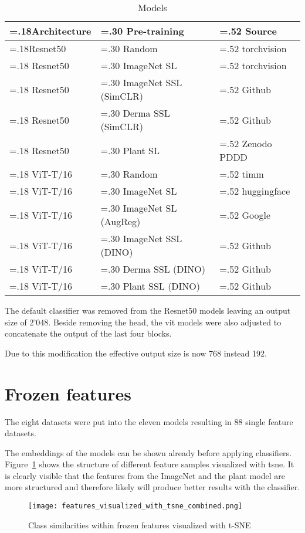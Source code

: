\begin{table}[H]
\centering
\caption{Models \label{tab:models}}
\begin{tabularx}{\textwidth}{|
    >{\hsize=.18\hsize}X |
    >{\hsize=.30\hsize}X |
    >{\hsize=.52\hsize}X |
}
\hline
\textbf{Architecture} & \textbf{Pre-training} & \textbf{Source} \tabularnewline \hline
Resnet50 & Random & torchvision \tabularnewline \hline
Resnet50 & ImageNet SL & torchvision \tabularnewline \hline
Resnet50 & ImageNet SSL (SimCLR) & Github \autocite{groeger2022} \tabularnewline \hline
Resnet50 & Derma SSL (SimCLR) & Github \autocite{groeger2022} \tabularnewline \hline
Resnet50 & Plant SL & Zenodo PDDD \autocite{zenodo2023} \tabularnewline \hline
ViT-T/16 & Random & timm \tabularnewline \hline
ViT-T/16 & ImageNet SL & huggingface \autocite{winkawaks2022} \tabularnewline \hline
ViT-T/16 & ImageNet SL (AugReg) & Google \autocite{google2024} \tabularnewline \hline
ViT-T/16 & ImageNet SSL (DINO) & Github \autocite{groeger2022} \tabularnewline \hline
ViT-T/16 & Derma SSL (DINO) & Github \autocite{groeger2022} \tabularnewline \hline
ViT-T/16 & Plant SSL (DINO) & Github \autocite{groeger2022} \tabularnewline \hline
\end{tabularx} 
\end{table}

The default classifier was removed from the Resnet50 models leaving an output size of 2'048.
Beside removing the head, the \gls{vit} models were also adjusted to concatenate the output of the last four blocks. 

Due to this modification the effective output size is now 768 instead 192.

\section{Frozen features}
The eight datasets were put into the eleven models resulting in 88 single feature datasets.

The embeddings of the models can be shown already before applying classifiers.
Figure~\ref{fig:features_visualized_with_tsne_combined} shows the structure of different feature samples visualized with \gls{tsne}.
It is clearly visible that the features from the ImageNet and the plant model are more structured and therefore likely will produce better results with the classifier. 

\begin{figure}[H]
    \begin{center}
    \texttt{[image: features\_visualized\_with\_tsne\_combined.png]}
    \caption{Class similarities within frozen features visualized with t-SNE}\label{fig:features_visualized_with_tsne_combined}
    \end{center}
\end{figure}

